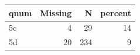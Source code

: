 \begin{table}[ht]
\centering
\begin{tabular}{lrrr}
 qnum & Missing & N & percent \\ 
  \hline
5c & 4 & 29 & 14 \\ 
  5d & 20 & 234 & 9 \\ 
  \end{tabular}
\end{table}
